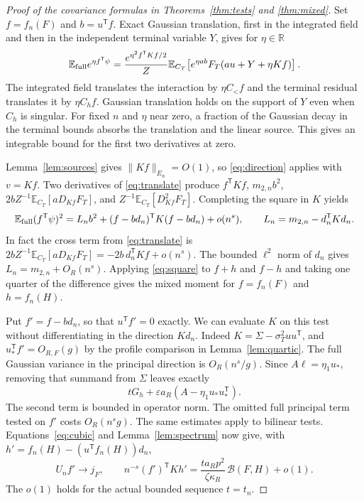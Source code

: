 \documentclass[11pt]{article}
\numberwithin{equation}{section}
\newcommand{\E}{\mathbb E}
\newcommand{\R}{\mathbb R}
\begin{document}
\begin{proof}[Proof of the covariance formulas in Theorems~\ref{thm:tests} and \ref{thm:mixed}]
Set $f=f_n(F)$ and $b=u^{\mathsf T}f$. Exact Gaussian
translation, first in the integrated field and then in the independent
terminal variable $Y$, gives for $\eta\in\R$
\begin{equation}
 \E_{\rm full} e^{\eta f^{\mathsf T}\psi}=
  \frac{e^{\eta^2 f^{\mathsf T}Kf/2}}{Z}
       \E_{C_T}\!\left[e^{\eta ab}F_T(au+Y+\eta Kf)\right].
 \label{eq:translate}
\end{equation}
The integrated field translates the interaction by $\eta C_<f$ and the
terminal residual translates it by $\eta C_h f$. Gaussian translation
holds on the support of $Y$ even when $C_h$ is singular. For fixed $n$
and $\eta$ near zero, a fraction of the Gaussian decay in the terminal
bounds absorbs the translation and the linear source. This gives an
integrable bound for the first two derivatives at zero.

Lemma~\ref{lem:sources} gives $\|Kf\|_{E_n}=O(1)$, so
\eqref{eq:direction} applies with $v=Kf$. Two derivatives of
\eqref{eq:translate} produce $f^{\mathsf T}Kf$, $m_{2,n} b^2$,
$2b Z^{-1}\E_{C_T}[aD_{Kf}F_T]$, and $Z^{-1}\E_{C_T}[D_{Kf}^2 F_T]$.
Completing the square in $K$ yields
\begin{equation}
 \E_{\rm full}(f^{\mathsf T}\psi)^2
 =L_n b^2+(f-bd_n)^{\mathsf T}K(f-bd_n)+o(n^s),
 \qquad L_n=m_{2,n}-d_n^{\mathsf T}K d_n .
 \label{eq:square}
\end{equation}
In fact the cross term from \eqref{eq:translate} is
$2bZ^{-1}\E_{C_T}[aD_{Kf}F_T]=-2b\,d_n^{\mathsf T}Kf+o(n^s)$.
The bounded $\ell^2$ norm of $d_n$ gives $L_n=m_{2,n}+O_R(n^s)$.
Applying \eqref{eq:square} to $f+h$ and $f-h$ and taking one quarter
of the difference gives the mixed moment for $f=f_n(F)$ and $h=f_n(H)$.

Put $f'=f-bd_n$, so that $u^{\mathsf T}f'=0$ exactly. We can
evaluate $K$ on this test without differentiating in the direction
$Kd_n$. Indeed $K=\Sigma-\sigma_T^2 uu^{\mathsf T}$, and
$u_*^{\mathsf T} f'=O_{R,F}(g)$ by the profile comparison in
Lemma~\ref{lem:quartic}. The full Gaussian variance in the principal
direction is $O_R(n^s/g)$. Since $A\ell=\eta_1u_*$, removing that
summand from $\Sigma$ leaves exactly
\begin{equation}
 tG_h+\varepsilon a_R(A-\eta_1 u_*u_*^{\mathsf T}).
\end{equation}
The second term is bounded in operator norm. The omitted full
principal term tested on $f'$ costs $O_R(n^s g)$. The same estimates
apply to bilinear tests. Equations~\eqref{eq:cubic} and
Lemma~\ref{lem:spectrum} now give, with $h'=f_n(H)-
(u^{\mathsf T}f_n(H))d_n$,
\begin{equation}
 U_n f'\to j_F,\qquad
 n^{-s}(f')^{\mathsf T}K h'
 =\frac{t a_Rp^2}{\zeta\kappa_R}\,\mathcal B(F,H)+o(1).
 \label{eq:reduced-limit}
\end{equation}
The $o(1)$ holds for the actual bounded sequence $t=t_n$.


\end{proof}
\end{document}
